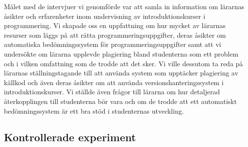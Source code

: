 \documentclass[a4paper,11pt]{article}
\begin{document}
{Målet med de intervjuer vi genomförde var att samla in information om lärarnas åsikter och erfarenheter inom undervisning av introduktionskurser i programmering. Vi skapade oss en uppfattning om hur mycket av lärarnas resurser som läggs på att rätta programmeringsuppgifter, deras åsikter om automatiska bedömningssystem för programmeringsuppgifter samt att vi undersökte om lärarna upplevde plagiering bland studenterna som ett problem och i vilken omfattning som de trodde att det sker. Vi ville dessutom ta reda på lärarnas ställningstagande till att använda system som upptäcker plagiering av källkod och även deras åsikter om att använda versionshanteringssystem i introduktionskurser. Vi ställde även frågor till lärarna om hur detaljerad återkopplingen till studenterna bör vara och om de trodde att ett automatiskt bedömningssystem är ett bra stöd i studenternas utveckling.

\subsection{Kontrollerade experiment}\label{Experiment}

}
\end{document}
